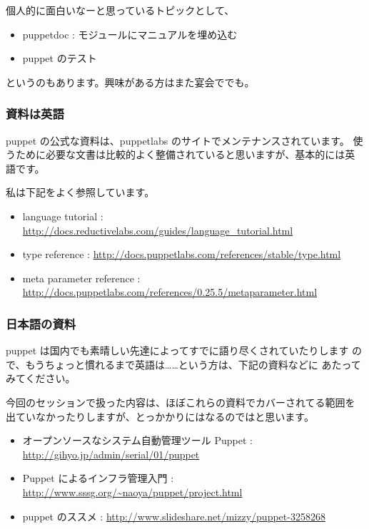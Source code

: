 \documentclass[mingoth,a4paper]{jsarticle}
\begin{document}
個人的に面白いなーと思っているトピックとして、

\begin{itemize}
 \item puppetdoc : モジュールにマニュアルを埋め込む
 \item puppet のテスト
\end{itemize}

というのもあります。興味がある方はまた宴会ででも。



\subsubsection{資料は英語}

puppet の公式な資料は、puppetlabs のサイトでメンテナンスされています。
使うために必要な文書は比較的よく整備されていると思いますが、基本的には英
語です。

私は下記をよく参照しています。

\begin{itemize}
 \item language tutorial : \url{http://docs.reductivelabs.com/guides/language_tutorial.html}
 \item type reference : \url{http://docs.puppetlabs.com/references/stable/type.html}
 \item meta parameter reference : \url{http://docs.puppetlabs.com/references/0.25.5/metaparameter.html}
\end{itemize}

\subsubsection{日本語の資料}

puppet は国内でも素晴しい先達によってすでに語り尽くされていたりします
ので、もうちょっと慣れるまで英語は……という方は、下記の資料などに
あたってみてください。

今回のセッションで扱った内容は、ほぼこれらの資料でカバーされてる範囲を
出ていなかったりしますが、とっかかりにはなるのではと思います。

\begin{itemize}
 \item オープンソースなシステム自動管理ツール Puppet : \url{http://gihyo.jp/admin/serial/01/puppet}
 \item Puppet によるインフラ管理入門 : \url{http://www.sssg.org/~naoya/puppet/project.html}
 \item puppet のススメ : \url{http://www.slideshare.net/mizzy/puppet-3258268}
\end{itemize}
\end{document}
